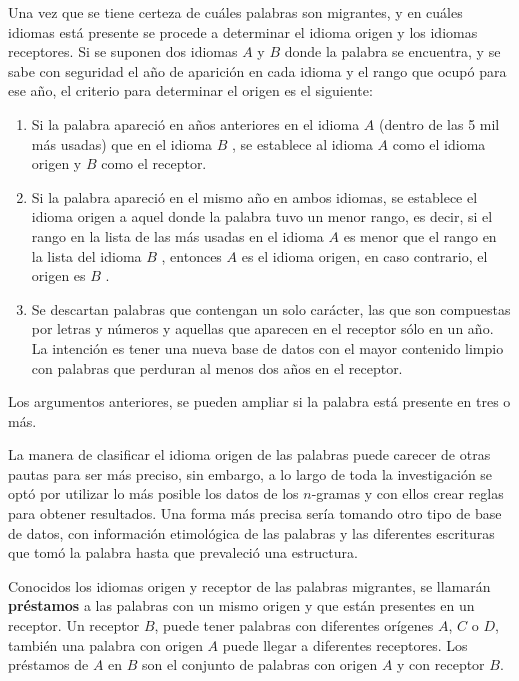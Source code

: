 Una vez que se tiene certeza de cuáles palabras son migrantes, y en cuáles
idiomas está presente se procede a determinar el idioma origen y los idiomas
receptores.   Si se suponen dos idiomas $\textit{A}$ y $\textit{B}$  donde la
palabra se encuentra, y se sabe con seguridad el año de aparición en cada
idioma y el rango que ocupó para ese año,  el criterio para determinar el
origen es el siguiente: 
\begin{enumerate}
\item  Si la palabra apareció en años anteriores en el idioma $\textit{A}$
(dentro de las 5 mil más usadas) que en el idioma $\textit{B}$ , se establece
al idioma $\textit{A}$  como el idioma origen y $\textit{B}$  como el receptor.
\item Si la palabra apareció en el mismo año en ambos idiomas, se establece el
idioma origen a aquel donde la palabra tuvo un menor rango, es decir, si el
rango en la lista de las más usadas en el idioma $\textit{A}$  es menor que el
rango en la lista del idioma $\textit{B}$ , entonces $\textit{A}$  es el idioma
origen, en caso contrario, el origen es $\textit{B}$ .
\item Se descartan palabras que contengan un solo carácter, las que son
compuestas por letras y números y aquellas que aparecen en el receptor sólo en un año. La intención es tener una  nueva base de datos con el mayor contenido
limpio con palabras que perduran al menos dos años en el receptor.

\end{enumerate}
Los argumentos anteriores, se pueden ampliar si la palabra está presente en
tres o más.

{}
La manera de clasificar el idioma origen de las palabras puede carecer de otras
pautas para ser más preciso, sin embargo, a lo largo de toda la investigación
se optó por utilizar lo más posible los datos de los $n$-gramas y  con ellos
crear reglas para obtener resultados.  Una forma más precisa sería tomando otro
tipo de base de datos, con información etimológica de las palabras y las
diferentes escrituras que tomó la palabra hasta que prevaleció una estructura.  

Conocidos los idiomas origen y receptor de las palabras migrantes, se llamarán
\textbf{préstamos} a las palabras con un mismo origen y que están  presentes en
un receptor.  Un receptor $\textit{B}$, puede tener palabras con diferentes
orígenes $\textit{A}$, $\textit{C}$ o $\textit{D}$, también una palabra con
origen $\textit{A}$ puede llegar a diferentes receptores.  Los préstamos de
$\textit{A}$  en $\textit{B}$  son el conjunto de palabras con origen
$\textit{A}$  y con receptor $\textit{B}$.     





